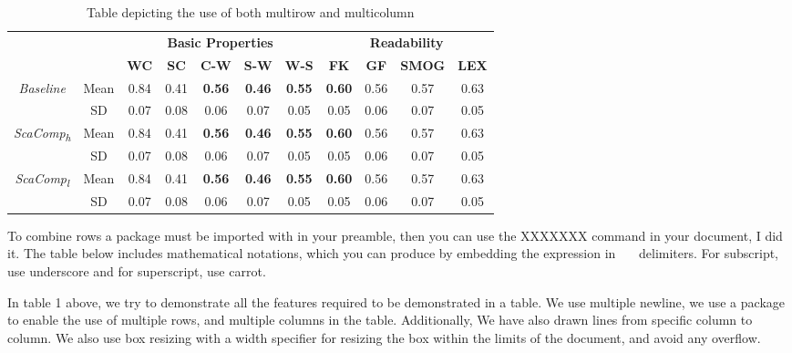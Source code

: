 \documentclass[15pt,a4paper]{article}
\begin{document}
\begin{table}[]
\caption{Table depicting the use of both multirow and multicolumn}
\centering
\begin{tabular}{ |c|c|c|c|c|c|c|c|c|c|c| }
\cline{3-11}
\multicolumn{2}{c|}{}&
\multicolumn{5}{|c|}{\textbf{Basic Properties}} & \multicolumn{4}{|c|}{\textbf{Readability}}\\
\cline{3-11}
\multicolumn{2}{c|}{}&
\textbf{WC} & \textbf{SC} & \textbf{C-W} & \textbf{S-W} & \textbf{W-S} & \textbf{FK} & \textbf{GF} & \textbf{SMOG} & \textbf{LEX}\\
\hline
\multirow{2}{*}{\textit{Baseline}} & Mean & 0.84
& 0.41
& \textbf{0.56}
& \textbf{0.46}
& \textbf{0.55}
& \textbf{0.60}
& 0.56
& 0.57
& 0.63\\

\cline{2-11}
& SD
& 0.07
& 0.08
& 0.06
& 0.07
& 0.05
& 0.05
& 0.06
& 0.07
& 0.05\\
\hline
\hline
\multirow{2}{*}{\textit{ScaComp\textsubscript{h}}} & Mean & 0.84
& 0.41
& \textbf{0.56}
& \textbf{0.46}
& \textbf{0.55}
& \textbf{0.60}
& 0.56
& 0.57
& 0.63\\

\cline{2-11}
& SD
& 0.07
& 0.08
& 0.06
& 0.07
& 0.05
& 0.05
& 0.06
& 0.07
& 0.05\\
\hline
\hline
\multirow{2}{*}{\textit{ScaComp\textsubscript{l}}} & Mean & 0.84
& 0.41
& \textbf{0.56}
& \textbf{0.46}
& \textbf{0.55}
& \textbf{0.60}
& 0.56
& 0.57
& 0.63\\

\cline{2-11}
& SD
& 0.07
& 0.08
& 0.06
& 0.07
& 0.05
& 0.05
& 0.06
& 0.07
& 0.05\\
\hline



\end{tabular}


  
\end{table}
\par

To combine rows a package must be imported with in your preamble, then
you can use the XXXXXXX command in your document, I did it.  The
table below includes mathematical notations, which you can produce by
embedding the expression in \textdollar \ \ \textdollar \ 
delimiters. For subscript, use underscore
and for superscript, use carrot.
\par
\vspace{5mm}

{\Large In table 1 above, we try to demonstrate all the features
required to be demonstrated in a table.  We use multiple
newline, we use a package to enable the use of multiple rows,
and multiple columns in the table.  Additionally, We have
also drawn lines from specific column to column. We also
use box resizing with a width specifier for resizing the box
within the limits of the document, and avoid any overflow. }
\end{document}
